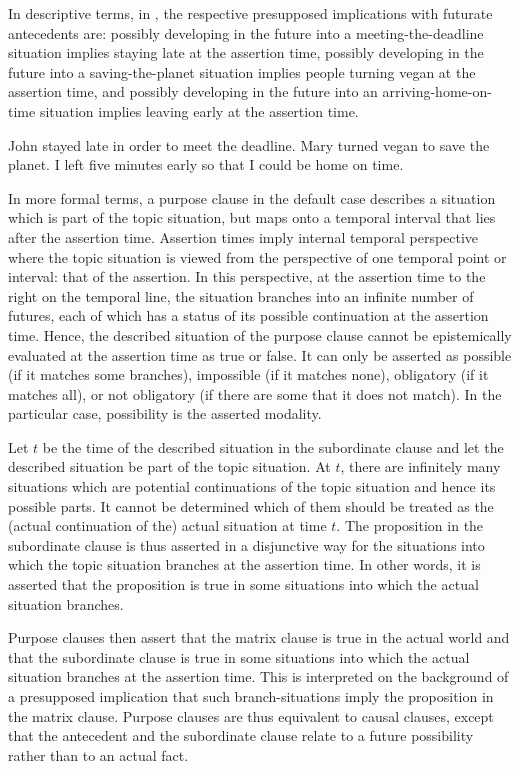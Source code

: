 \documentclass[output=paper]{langscibook}
\begin{document}
In descriptive terms, in , the respective presupposed implications with futurate antecedents are: possibly developing in the future into a meeting-the-deadline situation implies staying late at the assertion time, possibly developing in the future into a saving-the-planet situation implies people turning vegan at the assertion time, and possibly developing in the future into an arriving-home-on-time situation implies leaving early at the assertion time.

\ea\label{ex:Final1}
\ea John stayed late in order to meet the deadline.
\ex Mary turned vegan to save the planet.
\ex I left five minutes early so that I could be home on time.\label{ex:Final1-c}
\z\z

\noindent In more formal terms, a purpose clause in the default case describes a situation which is part of the topic situation, but maps onto a temporal interval that lies after the assertion time. Assertion times imply  internal temporal perspective where the topic situation is viewed from the perspective of one temporal point or interval: that of the assertion. In this perspective, at the assertion time to the right on the temporal line, the situation branches into an infinite number of futures, each of which has a status of its possible continuation at the assertion time. Hence, the described situation of the purpose clause cannot be epistemically evaluated at the assertion time as true or false. It can only be asserted as possible (if it matches some branches), impossible (if it matches none), obligatory (if it matches all), or not obligatory (if there are some that it does not match). In the particular case, possibility is the asserted modality.

Let $t$ be the time of the described situation in the subordinate clause and let the described situation be part of the topic situation. At $t$, there are infinitely many situations which are potential continuations of the topic situation and hence its possible parts. It cannot be determined which of them should be treated as the (actual continuation of the) actual situation at time $t$. The proposition in the subordinate clause is thus asserted in a disjunctive way for the situations into which the topic situation branches at the assertion time. In other words, it is asserted that the proposition is true in some situations into which the actual situation branches.

Purpose clauses then assert that the matrix clause is true in the actual world and that the subordinate clause is true in some situations into which the actual situation branches at the assertion time. This is interpreted on the background of a presupposed implication that such branch-situations imply the proposition in the matrix clause. Purpose clauses are thus equivalent to causal clauses, except that the antecedent and the subordinate clause relate to a future possibility rather than to an actual fact.
\end{document}
